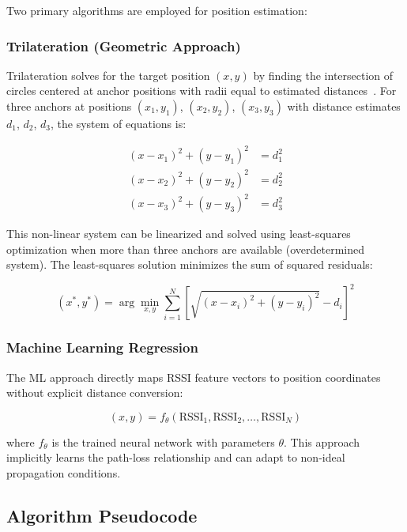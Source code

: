 Two primary algorithms are employed for position estimation:

\subsubsection{Trilateration (Geometric Approach)}

Trilateration solves for the target position $(x, y)$ by finding the intersection of circles centered at anchor positions with radii equal to estimated distances~\cite{cheung1994least, pahlavan2002indoor}. For three anchors at positions $(x_1, y_1)$, $(x_2, y_2)$, $(x_3, y_3)$ with distance estimates $d_1$, $d_2$, $d_3$, the system of equations is:

\begin{align}
(x - x_1)^2 + (y - y_1)^2 &= d_1^2 \\
(x - x_2)^2 + (y - y_2)^2 &= d_2^2 \\
(x - x_3)^2 + (y - y_3)^2 &= d_3^2
\end{align}

This non-linear system can be linearized and solved using least-squares optimization when more than three anchors are available (overdetermined system). The least-squares solution minimizes the sum of squared residuals:

\begin{equation}
(x^*, y^*) = \arg\min_{x,y} \sum_{i=1}^{N} \left[ \sqrt{(x - x_i)^2 + (y - y_i)^2} - d_i \right]^2
\end{equation}

\subsubsection{Machine Learning Regression}

The ML approach directly maps RSSI feature vectors to position coordinates without explicit distance conversion:

\begin{equation}
(x, y) = f_{\theta}(\text{RSSI}_1, \text{RSSI}_2, \ldots, \text{RSSI}_N)
\end{equation}

where $f_{\theta}$ is the trained neural network with parameters $\theta$. This approach implicitly learns the path-loss relationship and can adapt to non-ideal propagation conditions.

\subsection{Algorithm Pseudocode}


